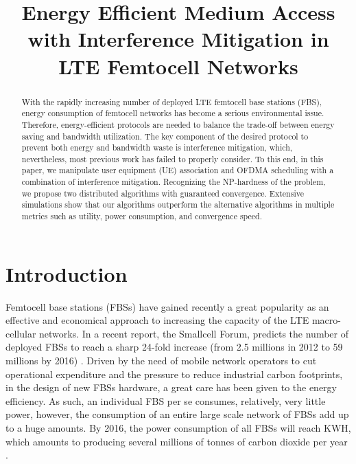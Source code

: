 \documentclass[conference]{IEEEtran}
\begin{document}
\title{Energy Efficient Medium Access with Interference Mitigation in LTE Femtocell Networks}


\author{
 }


\maketitle


\begin{abstract}

With the rapidly increasing number of deployed LTE femtocell base stations (FBS), energy consumption of femtocell networks has become a serious environmental issue. Therefore, energy-efficient protocols are needed to balance the trade-off between energy saving and bandwidth utilization. The key component of the desired protocol to prevent both energy and bandwidth waste is interference mitigation, which, nevertheless, most previous work has failed to properly consider. To this end, in this paper, we manipulate user equipment (UE) association and OFDMA scheduling with a combination of interference mitigation. Recognizing the NP-hardness of the problem, we propose two distributed algorithms with guaranteed convergence. Extensive simulations show that our algorithms outperform the alternative algorithms in multiple metrics such as utility, power consumption, and convergence speed.
\end{abstract}



\IEEEpeerreviewmaketitle


\section{Introduction}


Femtocell base stations (FBSs) have gained recently a great popularity as an effective and economical approach to increasing the capacity of the LTE macro-cellular networks. In a recent report, the Smallcell Forum, predicts the number of deployed FBSs to reach a sharp 24-fold increase (from 2.5 millions in 2012 to 59 millions by 2016) \cite{Informa2013}. Driven by the need of mobile network operators to cut operational expenditure and the pressure to reduce industrial carbon footprints, in the design of new FBSs hardware, a great care has been given to the energy efficiency. As such, an individual FBS per se consumes, relatively, very little power, however, the consumption of an entire large scale network of FBSs add up to a  huge amounts. By 2016, the power consumption of all FBSs will reach  KWH, which amounts to producing several millions of tonnes of carbon dioxide per year \cite{Informa2013}.
\end{document}
